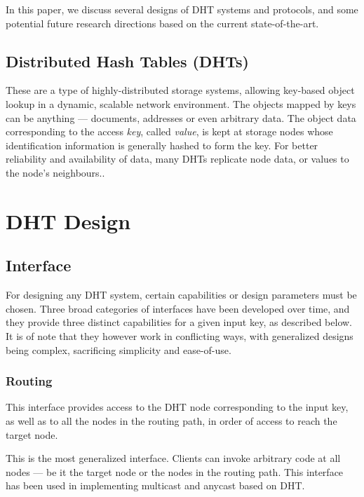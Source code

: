 \documentclass[11pt,a4paper]{article}
\begin{document}
    In this paper, we discuss several designs of DHT systems and protocols, and some potential future research directions based on the current state-of-the-art.
    
    \subsection{Distributed Hash Tables (DHTs)}
    
    These are a type of highly-distributed storage systems, allowing key-based object lookup in a dynamic, scalable network environment. The objects mapped by keys can be anything --- documents, addresses or even arbitrary data.\cite{ChordStoica} The object data corresponding to the access \textit{key}, called \textit{value}, is kept at storage nodes whose identification information is generally hashed to form the key. For better reliability and availability of data, many DHTs replicate node data, or values to the node's neighbours.\cite{PastryRowstron}.
    
    \section{DHT Design}\label{DHTDesign}
    
    \subsection{Interface}
    
    For designing any DHT system, certain capabilities or design parameters must be chosen. Three broad categories of interfaces have been developed over time, and they provide three distinct capabilities for a given input key, as described below. It is of note that they however work in conflicting ways, with generalized designs being complex,  sacrificing simplicity and ease-of-use. \cite{dabekp2p}
    
    \subsubsection{Routing} This interface provides access to the DHT node corresponding to the input key, as well as to all the nodes in the routing path, in order of access to reach the target node. 
    
    This is the most generalized interface. Clients can invoke arbitrary code at all nodes --- be it the target node or the nodes in the routing path. This interface has been used in implementing multicast \cite{SplitStreamCastro} and anycast \cite{TapestryZhao} based on DHT.
    
\end{document}
